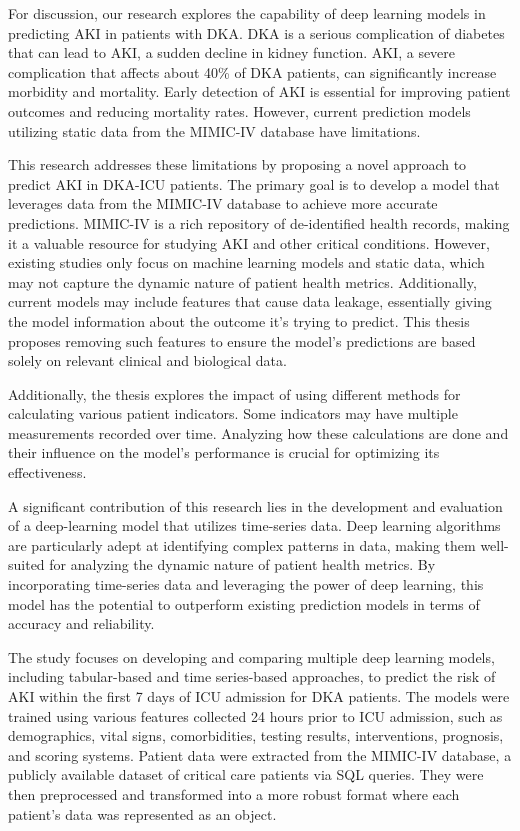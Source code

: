 \documentclass[sn-mathphys-num]{sn-jnl}%
\theoremstyle{thmstyleone}%
\theoremstyle{thmstyletwo}%
\theoremstyle{thmstylethree}%
\begin{document}
For discussion, our research explores the capability of deep learning models in predicting AKI in patients with DKA.
DKA is a serious complication of diabetes that can lead to AKI, a sudden decline in kidney function.
AKI, a severe complication that affects about 40\% of DKA patients, can significantly increase morbidity and mortality.
Early detection of AKI is essential for improving patient outcomes and reducing mortality rates.
However, current prediction models utilizing static data from the MIMIC-IV database have limitations.

This research addresses these limitations by proposing a novel approach to predict AKI in DKA-ICU patients.
The primary goal is to develop a model that leverages data from the MIMIC-IV database to achieve more accurate predictions.
MIMIC-IV is a rich repository of de-identified health records, making it a valuable resource for studying AKI and other critical conditions.
However, existing studies only focus on machine learning models and static data, which may not capture the dynamic nature of patient health metrics.
Additionally, current models may include features that cause data leakage, essentially giving the model information about the outcome it's trying to predict.
This thesis proposes removing such features to ensure the model's predictions are based solely on relevant clinical and biological data.

Additionally, the thesis explores the impact of using different methods for calculating various patient indicators.
Some indicators may have multiple measurements recorded over time.
Analyzing how these calculations are done and their influence on the model's performance is crucial for optimizing its effectiveness.

A significant contribution of this research lies in the development and evaluation of a deep-learning model that utilizes time-series data.
Deep learning algorithms are particularly adept at identifying complex patterns in data, making them well-suited for analyzing the dynamic nature of patient health metrics.
By incorporating time-series data and leveraging the power of deep learning, this model has the potential to outperform existing prediction models in terms of accuracy and reliability.

The study focuses on developing and comparing multiple deep learning models, including tabular-based and time series-based approaches, to predict the risk of AKI within the first 7 days of ICU admission for DKA patients.
The models were trained using various features collected 24 hours prior to ICU admission, such as demographics, vital signs, comorbidities, testing results, interventions, prognosis, and scoring systems.
Patient data were extracted from the MIMIC-IV database, a publicly available dataset of critical care patients via SQL queries.
They were then preprocessed and transformed into a more robust format where each patient's data was represented as an object.
\end{document}
